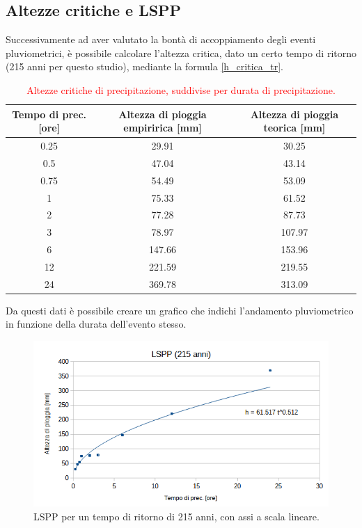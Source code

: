 \subsection{Altezze critiche e LSPP}

Successivamente ad aver valutato la bontà di accoppiamento degli eventi pluviometrici, è possibile calcolare l'altezza critica, dato un certo tempo di ritorno (215 anni per questo studio), mediante la formula \ref{h_critica_tr}.

\begin{table}[H] \centering
    \caption{\textcolor{red}{Altezze critiche di precipitazione, suddivise per durata di precipitazione.}}
            \begin{tabular}{ccc}
            \toprule
             Tempo di prec. [ore] & Altezza di pioggia empiririca [mm] & Altezza di pioggia teorica [mm]\\
            \midrule
0.25                     & 29.91           &  30.25    \\
0.5                      & 47.04           &   43.14  \\
0.75                     & 54.49           &   53.09 \\
1                        & 75.33           &   61.52  \\
2                        & 77.28           &    87.73 \\
3                        & 78.97           &   107.97  \\
6                        & 147.66          &  153.96 \\
12                       & 221.59          & 219.55 \\
24                       & 369.78          &  313.09\\
            \bottomrule
            \end{tabular}
\end{table}

\noindent Da questi dati è possibile creare un grafico che indichi l'andamento pluviometrico in funzione della durata dell'evento stesso.

\begin{figure}[H]\centering
    \includegraphics[scale=0.75]{immagini/LSPP_215.png}
    \caption{LSPP per un tempo di ritorno di 215 anni, con assi a scala lineare.}
\end{figure}

